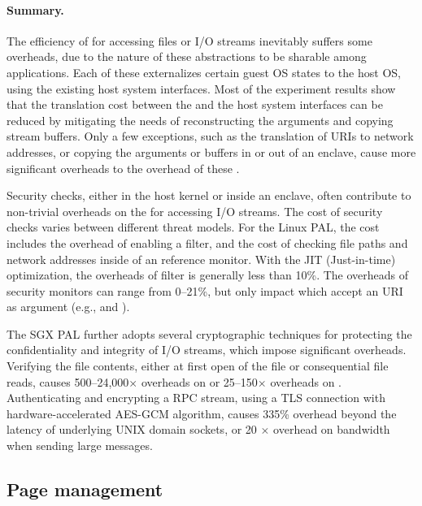 \paragraph{Summary.}
The efficiency of \hostapis{} for accessing files or I/O streams
inevitably suffers some overheads,
due to the nature of these abstractions to be sharable
among applications.
Each of these \hostapis{} externalizes certain guest OS states
to the host OS,
using the existing host system interfaces.
Most of the experiment results
show that the translation cost between the \hostapis{} and the host system interfaces can be reduced
by mitigating the needs of reconstructing the \hostapi{} arguments
and copying stream buffers.
Only a few exceptions, such as the translation of URIs to network addresses,
or copying the arguments or buffers in or out of an enclave,
cause more significant overheads to the overhead of these \linuxapis{}.




Security checks, either in the host kernel or inside an enclave,
often contribute to
non-trivial overheads on the \hostapis{} for accessing I/O streams.
The cost of security checks
varies between different threat models.
For the Linux PAL, the cost includes the overhead of enabling a \seccomp{} filter, and the cost of checking file paths and network addresses
inside of an reference monitor.
With the JIT (Just-in-time) optimization,
the overheads of \seccomp{} filter is generally less than 10\%.
The overheads of security monitors can range from 0--21\%, but only impact \hostapis{} which accept an URI as argument (e.g.,  and ).

 
The SGX PAL further adopts several cryptographic techniques
for protecting the confidentiality and integrity of I/O streams, which impose significant overheads.
Verifying the file contents, either at first open of the file or consequential file reads,
causes 500--24,000$\times$ overheads on 
or 25--150$\times$ overheads on .
Authenticating and encrypting a RPC stream, using a TLS connection with hardware-accelerated AES-GCM algorithm,
causes \roughly{}335\% overhead beyond the latency of underlying UNIX domain sockets,
or \roughly{}20 $\times$ overhead on bandwidth when sending large messages.






\subsection{Page management}


